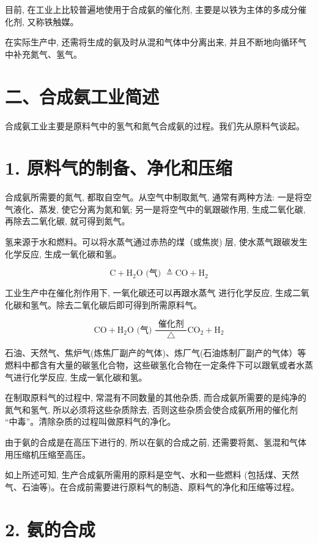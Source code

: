 \documentclass[10pt]{article}
\begin{document}
目前, 在工业上比较普遍地使用于合成氨的催化剂, 主要是以铁为主体的多成分催化剂, 又称铁触媒。

在实际生产中, 还需将生成的氨及时从混和气体中分离出来, 并且不断地向循环气中补充氮气、氢气。

\section*{二、合成氨工业简述}

合成氨工业主要是原料气中的氢气和氮气合成氨的过程。我们先从原料气谈起。

\section*{1. 原料气的制备、净化和压缩}

合成氨所需要的氮气, 都取自空气。从空气中制取氮气, 通常有两种方法: 一是将空气液化、蒸发, 使它分离为氮和氧; 另一是将空气中的氧跟碳作用, 生成二氧化碳, 再除去二氧化碳, 就可得到氮气。

氢来源于水和燃料。可以将水蒸气通过赤热的煤（或焦炭) 层, 使水蒸气跟碳发生化学反应, 生成一氧化碳和氢。

\[
\mathrm{C} + {\mathrm{H}}_{2}\mathrm{O}\text{ (气) } \triangleq \mathrm{{CO}} + {\mathrm{H}}_{2}
\]

工业生产中在催化剂作用下, 一氧化碳还可以再跟水蒸气 进行化学反应, 生成二氧化碳和氢气。除去二氧化碳后即可得到所需原料气。

\[
\mathrm{{CO}} + {\mathrm{H}}_{2}\mathrm{O}\text{ (气) }\frac{\text{ 催化剂 }}{\bigtriangleup }{\mathrm{{CO}}}_{2} + {\mathrm{H}}_{2}
\]

石油、天然气、焦炉气(炼焦厂副产的气体)、炼厂气(石油炼制厂副产的气体）等燃料中都含有大量的碳氢化合物，这些碳氢化合物在一定条件下可以跟氧或者水蒸气进行化学反应, 生成一氧化碳和氢。

在制取原料气的过程中, 常混有不同数量的其他杂质, 而合成氨所需要的是纯净的氮气和氢气, 所以必须将这些杂质除去, 否则这些杂质会使合成氨所用的催化剂 “中毒”。清除杂质的过程叫做原料气的净化。

由于氨的合成是在高压下进行的, 所以在氨的合成之前, 还需要将氮、氢混和气体用压缩机压缩至高压。

如上所述可知, 生产合成氨所需用的原料是空气、水和一些燃料 (包括煤、天然气、石油等)。在合成前需要进行原料气的制造、原料气的净化和压缩等过程。

\section*{2. 氨的合成}
\end{document}
